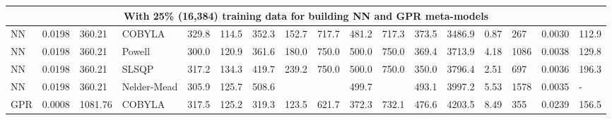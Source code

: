 \begin{tabular}{|lllllllllllllllll|}
\multicolumn{17}{|c|}{With 25\% (16,384) training data for building NN and GPR meta-models} \\ \hline
\multicolumn{1}{|l|}{NN} & \multicolumn{1}{l|}{0.0198} & \multicolumn{1}{l|}{360.21} & \multicolumn{1}{l|}{COBYLA} & \multicolumn{1}{l|}{329.8} & \multicolumn{1}{l|}{114.5} & \multicolumn{1}{l|}{352.3} & \multicolumn{1}{l|}{152.7} & \multicolumn{1}{l|}{717.7} & \multicolumn{1}{l|}{481.2} & \multicolumn{1}{l|}{717.3} & \multicolumn{1}{l|}{373.5} & \multicolumn{1}{l|}{3486.9} & \multicolumn{1}{l|}{0.87} & \multicolumn{1}{l|}{267} & \multicolumn{1}{l|}{0.0030} & 112.9 \\ \hline
\multicolumn{1}{|l|}{NN} & \multicolumn{1}{l|}{0.0198} & \multicolumn{1}{l|}{360.21} & \multicolumn{1}{l|}{Powell} & \multicolumn{1}{l|}{300.0} & \multicolumn{1}{l|}{120.9} & \multicolumn{1}{l|}{361.6} & \multicolumn{1}{l|}{180.0} & \multicolumn{1}{l|}{750.0} & \multicolumn{1}{l|}{500.0} & \multicolumn{1}{l|}{750.0} & \multicolumn{1}{l|}{369.4} & \multicolumn{1}{l|}{3713.9} & \multicolumn{1}{l|}{4.18} & \multicolumn{1}{l|}{1086} & \multicolumn{1}{l|}{0.0038} & 129.8 \\ \hline
\multicolumn{1}{|l|}{NN} & \multicolumn{1}{l|}{0.0198} & \multicolumn{1}{l|}{360.21} & \multicolumn{1}{l|}{SLSQP} & \multicolumn{1}{l|}{317.2} & \multicolumn{1}{l|}{134.3} & \multicolumn{1}{l|}{419.7} & \multicolumn{1}{l|}{239.2} & \multicolumn{1}{l|}{750.0} & \multicolumn{1}{l|}{500.0} & \multicolumn{1}{l|}{750.0} & \multicolumn{1}{l|}{350.0} & \multicolumn{1}{l|}{3796.4} & \multicolumn{1}{l|}{2.51} & \multicolumn{1}{l|}{697} & \multicolumn{1}{l|}{0.0036} & 196.3 \\ \hline
\multicolumn{1}{|l|}{NN} & \multicolumn{1}{l|}{0.0198} & \multicolumn{1}{l|}{360.21} & \multicolumn{1}{l|}{Nelder-Mead} & \multicolumn{1}{l|}{305.9} & \multicolumn{1}{l|}{125.7} & \multicolumn{1}{l|}{508.6} & \multicolumn{1}{l|}{\cellcolor[HTML]{F8CBAD}{\color[HTML]{FF0000} 270.4}} & \multicolumn{1}{l|}{\cellcolor[HTML]{F8CBAD}{\color[HTML]{FF0000} 477.0}} & \multicolumn{1}{l|}{499.7} & \multicolumn{1}{l|}{\cellcolor[HTML]{F8CBAD}{\color[HTML]{FF0000} 1269.1}} & \multicolumn{1}{l|}{493.1} & \multicolumn{1}{l|}{3997.2} & \multicolumn{1}{l|}{5.53} & \multicolumn{1}{l|}{1578} & \multicolumn{1}{l|}{0.0035} & - \\ \hline
\multicolumn{1}{|l|}{GPR} & \multicolumn{1}{l|}{0.0008} & \multicolumn{1}{l|}{1081.76} & \multicolumn{1}{l|}{COBYLA} & \multicolumn{1}{l|}{317.5} & \multicolumn{1}{l|}{125.2} & \multicolumn{1}{l|}{319.3} & \multicolumn{1}{l|}{123.5} & \multicolumn{1}{l|}{621.7} & \multicolumn{1}{l|}{372.3} & \multicolumn{1}{l|}{732.1} & \multicolumn{1}{l|}{476.6} & \multicolumn{1}{l|}{4203.5} & \multicolumn{1}{l|}{8.49} & \multicolumn{1}{l|}{355} & \multicolumn{1}{l|}{0.0239} & 156.5 \\ \hline

\end{tabular}
